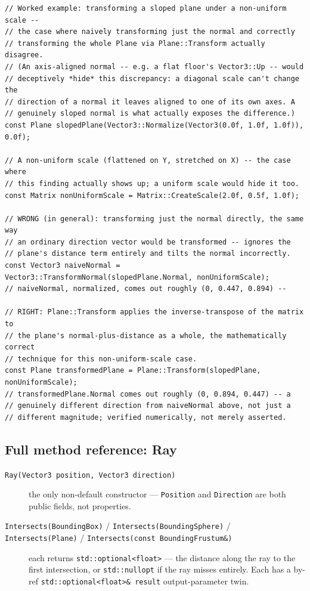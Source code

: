 \begin{lstlisting}
// Worked example: transforming a sloped plane under a non-uniform scale --
// the case where naively transforming just the normal and correctly
// transforming the whole Plane via Plane::Transform actually disagree.
// (An axis-aligned normal -- e.g. a flat floor's Vector3::Up -- would
// deceptively *hide* this discrepancy: a diagonal scale can't change the
// direction of a normal it leaves aligned to one of its own axes. A
// genuinely sloped normal is what actually exposes the difference.)
const Plane slopedPlane(Vector3::Normalize(Vector3(0.0f, 1.0f, 1.0f)), 0.0f);

// A non-uniform scale (flattened on Y, stretched on X) -- the case where
// this finding actually shows up; a uniform scale would hide it too.
const Matrix nonUniformScale = Matrix::CreateScale(2.0f, 0.5f, 1.0f);

// WRONG (in general): transforming just the normal directly, the same way
// an ordinary direction vector would be transformed -- ignores the
// plane's distance term entirely and tilts the normal incorrectly.
const Vector3 naiveNormal = Vector3::TransformNormal(slopedPlane.Normal, nonUniformScale);
// naiveNormal, normalized, comes out roughly (0, 0.447, 0.894) --

// RIGHT: Plane::Transform applies the inverse-transpose of the matrix to
// the plane's normal-plus-distance as a whole, the mathematically correct
// technique for this non-uniform-scale case.
const Plane transformedPlane = Plane::Transform(slopedPlane, nonUniformScale);
// transformedPlane.Normal comes out roughly (0, 0.894, 0.447) -- a
// genuinely different direction from naiveNormal above, not just a
// different magnitude; verified numerically, not merely asserted.
\end{lstlisting}

\subsection{Full method reference: Ray}

\begin{description}
\item[\texttt{Ray(Vector3 position, Vector3 direction)}] the only non-default constructor ---
  \texttt{Position} and \texttt{Direction} are both public fields, not properties.
\item[\texttt{Intersects(BoundingBox)} / \texttt{Intersects(BoundingSphere)} /
  \texttt{Intersects(Plane)} / \texttt{Intersects(const BoundingFrustum\&)}] each returns
  \texttt{std::optional<float>} --- the distance along the ray to the first intersection, or
  \texttt{std::nullopt} if the ray misses entirely. Each has a by-ref
  \texttt{std::optional<float>\& result} output-parameter twin.
\end{description}

